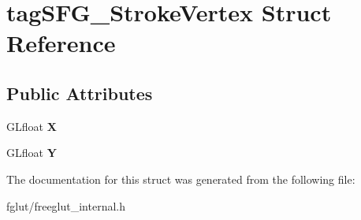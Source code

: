 \hypertarget{structtag_s_f_g___stroke_vertex}{}\section{tag\+S\+F\+G\+\_\+\+Stroke\+Vertex Struct Reference}
\label{structtag_s_f_g___stroke_vertex}
\subsection*{Public Attributes}
\begin{DoxyCompactItemize}
\item 
G\+Lfloat {\bfseries X}\hypertarget{structtag_s_f_g___stroke_vertex_ab47fef053eced8f9cd564b48513ae1c6}{}\label{structtag_s_f_g___stroke_vertex_ab47fef053eced8f9cd564b48513ae1c6}

\item 
G\+Lfloat {\bfseries Y}\hypertarget{structtag_s_f_g___stroke_vertex_af942a1c90d00b490bab872913e3c4add}{}\label{structtag_s_f_g___stroke_vertex_af942a1c90d00b490bab872913e3c4add}

\end{DoxyCompactItemize}


The documentation for this struct was generated from the following file\+:\begin{DoxyCompactItemize}
\item 
fglut/freeglut\+\_\+internal.\+h\end{DoxyCompactItemize}

